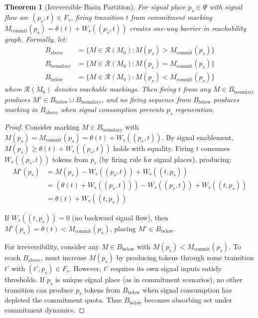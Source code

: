 \documentclass[10pt,letterpaper]{article}
\newtheorem{theorem}{Theorem}
\begin{document}
\begin{theorem}[Irreversible Basin Partition]
For signal place $p_s \in \Psi$ with signal flow arc $(p_s,t) \in F_s$, firing transition $t$ from commitment marking $M_{\text{commit}}(p_s) = \theta(t) + W_s((p_s,t))$ creates one-way barrier in reachability graph. Formally, let:
\begin{align*}
B_{\text{above}} &= \{M \in \mathcal{R}(M_0) : M(p_s) > M_{\text{commit}}(p_s)\} \\
B_{\text{boundary}} &= \{M \in \mathcal{R}(M_0) : M(p_s) = M_{\text{commit}}(p_s)\} \\
B_{\text{below}} &= \{M \in \mathcal{R}(M_0) : M(p_s) < M_{\text{commit}}(p_s)\}
\end{align*}
where $\mathcal{R}(M_0)$ denotes reachable markings. Then firing $t$ from any $M \in B_{\text{boundary}}$ produces $M' \in B_{\text{below}} \cup B_{\text{boundary}}$, and no firing sequence from $B_{\text{below}}$ produces marking in $B_{\text{above}}$ when signal consumption prevents $p_s$ regeneration.
\end{theorem}

\begin{proof}
Consider marking $M \in B_{\text{boundary}}$ with
$M(p_s) = M_{\text{commit}}(p_s) = \theta(t) + W_s((p_s,t))$.
By signal enablement, $M(p_s) \geq \theta(t) + W_s((p_s,t))$ holds with equality. Firing $t$ consumes $W_s((p_s,t))$ tokens from $p_s$ (by firing rule for signal places), producing:
\begin{align*}
M'(p_s) &= M(p_s) - W_s((p_s,t)) + W_s((t,p_s)) \\
&= (\theta(t) + W_s((p_s,t))) - W_s((p_s,t)) + W_s((t,p_s)) \\
&= \theta(t) + W_s((t,p_s))
\end{align*}

If $W_s((t,p_s)) = 0$ (no backward signal flow), then
$M'(p_s) = \theta(t) < M_{\text{commit}}(p_s)$,
placing $M' \in B_{\text{below}}$.

For irreversibility, consider any $M \in B_{\text{below}}$ with $M(p_s) < M_{\text{commit}}(p_s)$. To reach $B_{\text{above}}$, must increase $M(p_s)$ by producing tokens through some transition $t'$ with $(t',p_s) \in F_s$. However, $t'$ requires its own signal inputs satisfy thresholds. If $p_s$ is unique signal place (as in commitment scenarios), no other transition can produce $p_s$ tokens from $B_{\text{below}}$ when signal consumption has depleted the commitment quota. Thus $B_{\text{below}}$ becomes absorbing set under commitment dynamics.
\end{proof}
\end{document}
